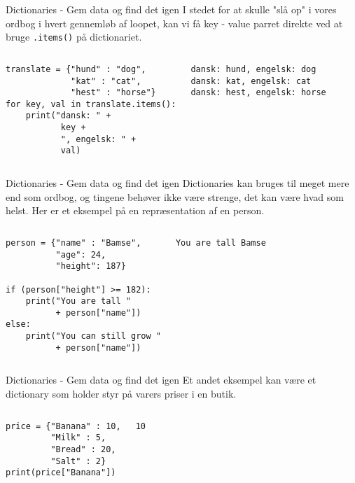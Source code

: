\documentclass[main.tex]{subfiles}
\begin{document}
\begin{frame}[fragile]{Dictionaries - Gem data og find det igen}
	I stedet for at skulle "slå op" i vores ordbog i hvert gennemløb af loopet, kan vi få key - value parret direkte ved at bruge \texttt{.items()} på dictionariet.
	\begin{columns}
		\begin{lstlisting}[style=python]
translate = {"hund" : "dog", 
             "kat" : "cat", 
             "hest" : "horse"}
for key, val in translate.items():
    print("dansk: " + 
           key + 
           ", engelsk: " + 
           val)
		\end{lstlisting}
		
		\pause
		\begin{lstlisting}[style=python]
dansk: hund, engelsk: dog
dansk: kat, engelsk: cat
dansk: hest, engelsk: horse
		\end{lstlisting}
	\end{columns}	
\end{frame}

\begin{frame}[fragile]{Dictionaries - Gem data og find det igen}
	Dictionaries kan bruges til meget mere end som ordbog, og tingene behøver ikke være strenge, det kan være hvad som helst. Her er et eksempel på en repræsentation af en person.
	\begin{columns}
		\column{0.5\textwidth}
		\begin{lstlisting}[style=python]
person = {"name" : "Bamse",
          "age": 24,
          "height": 187}

if (person["height"] >= 182):
	print("You are tall "
	      + person["name"])
else:
	print("You can still grow "
	      + person["name"])
		\end{lstlisting}
		
		\pause
		\column{0.3\textwidth}
		\begin{lstlisting}[style=python]
You are tall Bamse
		\end{lstlisting}
	\end{columns}	
\end{frame}

\begin{frame}[fragile]{Dictionaries - Gem data og find det igen}
Et andet eksempel kan være et dictionary som holder styr på varers priser i en butik.
\begin{columns}
	\begin{lstlisting}[style=python]
price = {"Banana" : 10,
         "Milk" : 5,
         "Bread" : 20,
         "Salt" : 2}
print(price["Banana"])
	\end{lstlisting}
	
	\pause
	\begin{lstlisting}[style=python]
10
	\end{lstlisting}
\end{columns}	
\end{frame}
\end{document}
